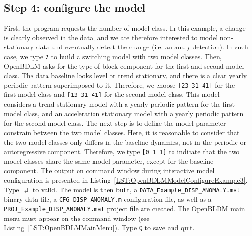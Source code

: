 \subsection{Step 4: configure the model}

First, the program requests the number of model class.
In this example, a change is clearly observed in the data, and we are therefore interested to model non-stationary data and eventually detect the change (i.e. anomaly detection).
In such case, we type \colorbox{light-gray}{\lstinline[basicstyle = \mlttfamily \small, backgroundcolor = \color{light-gray}]!2!} to build a switching model with two model classes.
Then, OpenBDLM asks for the type of block component for the first and second model class. 
The data baseline looks level or trend stationary, and there is a clear yearly periodic pattern superimposed to it.
Therefore, we choose \colorbox{light-gray}{\lstinline[basicstyle = \mlttfamily \small, backgroundcolor = \color{light-gray}]![23 31 41]!} for the first model class and \colorbox{light-gray}{\lstinline[basicstyle = \mlttfamily \small, backgroundcolor = \color{light-gray}]![13 31 41]!} for the second model class.
This model considers a trend stationary model with a yearly periodic pattern for the first model class, and an acceleration stationary model with a yearly periodic pattern for the second model class.
The next step is to define the model parameter constrain between the two model classes. 
Here, it is reasonable to consider that the two model classes only differs in the baseline dynamics, not in the periodic or autoregressive component. 
Therefore, we type \colorbox{light-gray}{\lstinline[basicstyle = \mlttfamily \small, backgroundcolor = \color{light-gray}]![0 1 1]!} to indicate that the two model classes share the same model parameter, except for the baseline component.
The  output on \MATLAB{} command window during interactive model configuration is presented in Listing~\ref{LST:OpenBDLMModelConfigureExample3}.
Type $\dlsh$ to valid.
The model is then built, a \lstinline[basicstyle = \mlttfamily \small, backgroundcolor = \color{light-gray}]!DATA_Example_DISP_ANOMALY.mat! binary data file, a \lstinline[basicstyle = \mlttfamily \small, backgroundcolor = \color{light-gray}]!CFG_DISP_ANOMALY.m! configuration file, as well as a \lstinline[basicstyle = \mlttfamily \small, backgroundcolor = \color{light-gray}]!PROJ_Example_DISP_ANOMALY.mat! project file are created.
The OpenBLDM main menu must appear on the \MATLAB{} command window (see Listing~\ref{LST:OpenBDLMMainMenu}).
Type \colorbox{light-gray}{\lstinline[basicstyle = \mlttfamily \small, backgroundcolor = \color{light-gray}]!Q!} to save and quit.



